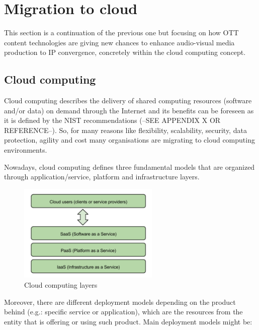 \section{Migration to cloud}

This section is a continuation of the previous one but focusing on how OTT content technologies are giving new chances to enhance audio-visual media production to IP convergence, concretely within the cloud computing concept. 

\subsection{Cloud computing}

Cloud computing describes the delivery of shared computing resources (software and/or data) on demand through the Internet and its benefits can be foreseen as it is defined by the NIST recommendations (--SEE APPENDIX X OR REFERENCE--). So, for many reasons like flexibility, scalability, security, data protection, agility and cost many organisations are migrating to cloud computing environments. 

Nowadays, cloud computing defines three fundamental models that are organized through application/service, platform and infrastructure layers.

\begin{figure}[htb]
\begin{center}
\includegraphics[width=0.6\textwidth]{./images/Cloud_computing_layers.png}
\caption{Cloud computing layers}
\label{F:cloudComputingLayers}
\end{center}
\end{figure}

Moreover, there are different deployment models depending on the product behind (e.g.: specific service or application), which are the resources from the entity that is offering or using such product. Main deployment models might be:

